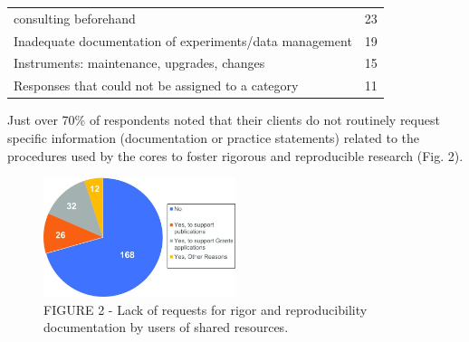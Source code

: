 \documentclass[]{article}
\begin{document}
\begin{longtable}[]{@{}ll@{}}
\begin{minipage}[t]{0.05\columnwidth}
consulting beforehand\strut
\end{minipage} & \begin{minipage}[t]{0.05\columnwidth}\raggedright\strut
23\strut
\end{minipage}\tabularnewline
\begin{minipage}[t]{0.05\columnwidth}\raggedright\strut
Inadequate documentation of experiments/data management\strut
\end{minipage} & \begin{minipage}[t]{0.05\columnwidth}\raggedright\strut
19\strut
\end{minipage}\tabularnewline
\begin{minipage}[t]{0.05\columnwidth}\raggedright\strut
Instruments: maintenance, upgrades, changes\strut
\end{minipage} & \begin{minipage}[t]{0.05\columnwidth}\raggedright\strut
15\strut
\end{minipage}\tabularnewline
\begin{minipage}[t]{0.05\columnwidth}\raggedright\strut
Responses that could not be assigned to a category\strut
\end{minipage} & \begin{minipage}[t]{0.05\columnwidth}\raggedright\strut
11\strut
\end{minipage}\tabularnewline
\bottomrule
\end{longtable}

Just over 70\% of respondents noted that their clients do not routinely
request specific information (documentation or practice statements)
related to the procedures used by the cores to foster rigorous and
reproducible research (Fig. 2).

\begin{figure}
\centering
\includegraphics[width=0.50000\textwidth,height=0.50000\textwidth]{../figs/fig2_paper.jpg}
\caption{FIGURE 2 - Lack of requests for rigor and reproducibility
documentation by users of shared resources.}
\end{figure}
\end{document}
